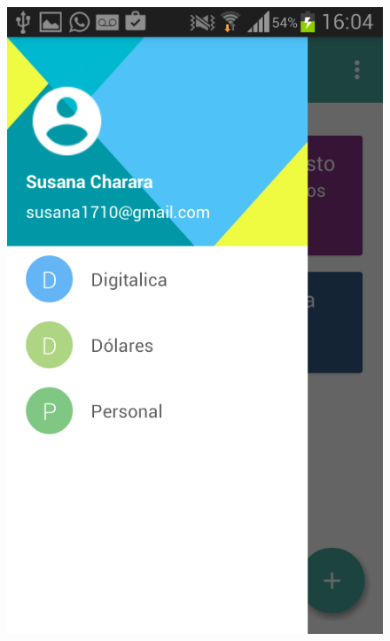 \begin{figure}[ht]
\begin{minipage}{.5\textwidth}  
\centering
  \includegraphics[scale=0.30,type=png,ext=.png,read=.png]{imagenes/Screenshots/sidebar}
  \captionsetup{justification=centering}
  \label{fig:interfazCambiarCuenta}\end{minipage}
\end{figure}

